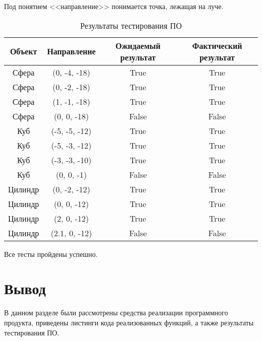 Под понятием <<направление>> понимается точка, лежащая на луче.

\begin{table}[h]
	\begin{center}
		\begin{threeparttable}
			\caption{Результаты тестирования ПО}
			\label{tbl:testing}
			\begin{tabular}{|c|c|c|c|}
				\hline
				{Объект} & {Направление}  & {Ожидаемый результат} & {Фактический результат}\\
				\hline
				Сфера & {(0, -4, -18)} & {True} & {True}\\
				\hline
				Сфера & {(0, -2, -18)} & {True} & {True}\\
				\hline
				Сфера & {(1, -1, -18)} & {True} & {True}\\
				\hline
				Сфера & {(0, 0, -18)} & {False} & {False}\\
				\hline
				Куб & {(-5, -5, -12)} & {True} & {True}\\
				\hline
				Куб & {(-5, -3, -12)} & {True} & {True}\\
				\hline
				Куб & {(-3, -3, -10)} & {True} & {True}\\
				\hline
				Куб & {(0, 0, -1)} & {False} & {False}\\
				\hline
				Цилиндр & {(0, -2, -12)} & {True} & {True}\\
				\hline
				Цилиндр & {(0, 0, -12)} & {True} & {True}\\
				\hline
				Цилиндр & {(2, 0, -12)} & {True} & {True}\\
				\hline
				Цилиндр & {(2.1, 0, -12)} & {False} & {False}\\
				\hline
				
			\end{tabular}
		\end{threeparttable}
	\end{center}
\end{table}

Все тесты пройдены успешно.



\section*{Вывод}
В данном разделе были рассмотрены средства реализации программного продукта, приведены листинги кода реализованных функций, а также результаты тестирования ПО.